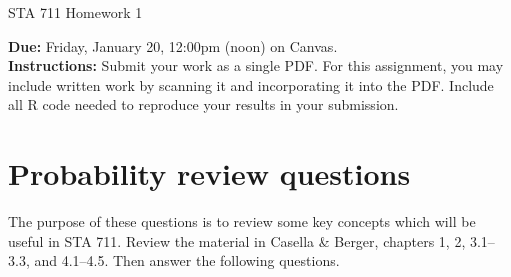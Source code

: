 \documentclass[11pt]{article}
\begin{document}
\begin{center}
\Large
STA 711 Homework 1\\
\normalsize
\vspace{5mm}
\end{center}

\noindent \textbf{Due:} Friday, January 20, 12:00pm (noon) on Canvas.\\ 

\noindent \textbf{Instructions:} Submit your work as a single PDF. For this assignment, you may include written work by scanning it and incorporating it into the PDF. Include all R code needed to reproduce your results in your submission.

\section{Probability review questions}

The purpose of these questions is to review some key concepts which will be useful in STA 711. Review the material in Casella \& Berger, chapters 1, 2, 3.1--3.3, and 4.1--4.5. Then answer the following questions.
\end{document}
